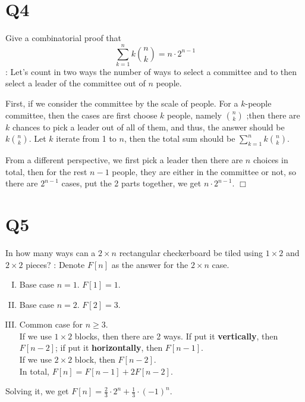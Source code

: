 \documentclass[a4paper,11pt]{article}
\def\endproofmark{$\Box$}
\newenvironment{proof}{{\bf Proof}:}{\endproofmark\smallskip}
\newenvironment{solution}{{\\\bf Solution}:}{\smallskip}
\begin{document}
\section*{Q4}
Give a combinatorial proof that
\begin{equation*}
  \sum_{k=1}^{n }k\binom{n }{k}=n\cdot 2^{n-1}
\end{equation*}
\begin{proof}
    Let's count in two ways the number of ways to select a
committee and to then select a leader of the committee out of $n$ people.

First, if we consider the committee by the scale of people. For a $k$-people
committee, then the cases are first choose $k$ people, namely $\binom{n }{k}$
;then there are $k$ chances to pick a leader out of all of them, and thus, 
the answer should be $k\binom{n }{k}$. Let $k$ iterate from 1 to $n$, then the total sum should be $\sum_{k=1}^{n }k\binom{n }{k}$.

From a different perspective, we first pick a leader then there are $n$ choices in total, then for the rest $n-1$ people, they are either in the committee or not, so there are $2^{n-1}$ cases, put the 2 parts together, we get $n\cdot 2^{n-1}$.
\end{proof}

\section*{Q5}
In how many ways can a $2 \times  n$ rectangular checkerboard be
tiled using $1 \times  2$ and $2 \times  2$ pieces?
\begin{solution}
Denote $F[n]$ as the answer for the $2\times n$ case.
\begin{enumerate}[(I)]
    \item Base case $n=1$.
    $F[1]=1$.

    \item Base case $n=2$.
    $F[2]=3$.

    
    \item Common case for $n\ge 3$. \\
    If we use $1\times 2$ blocks, then there are 2 ways. If put it \textbf{vertically}, then $F[n-2]$; if put it \textbf{horizontally}, then $F[n-1]$. \\
    If we use $2\times 2$ block, then $F[n-2]$.\\
    In total, $F[n]=F[n-1]+2F[n-2]$.
\end{enumerate}
Solving it, we get $F[n]=\frac{2}{3}\cdot 2^{n}+\frac{1}{3}\cdot (-1)^{n}$.
\end{solution}
\end{document}
